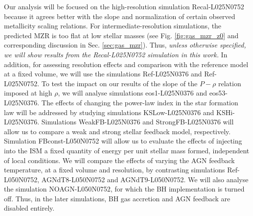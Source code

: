 \documentclass[useAMS,usenatbib]{mn2e}
\begin{document}
Our analysis will be focused on the high-resolution simulation Recal-L025N0752
because it agrees better with the 
slope and normalization of certain
observed metallicity scaling relations.
For intermediate-resolution simulations, the predicted MZR is too flat at
low stellar masses (see Fig. \ref{fig:gas_mzr_z0} and corresponding discussion 
in Sec. \ref{sec:gas_mzr}). 
Thus, {\em unless otherwise specified, 
we will show results from the Recal-L025N0752 simulation in this work.}
In addition, for assessing resolution effects and comparison with the
reference model at a fixed volume, we will use the
simulations Ref-L025N0376 and Ref-L025N0752.  To test the impact on our results of
the slope of the $P - \rho$ relation imposed at high $\rho$, 
we will analyse simulations eos1-L025N0376 and eos5\/3-L025N0376.
The effects of changing the power-law index in the star formation law
will be addressed by studying simulations KSLow-L025N0376 and KSHi-L025N0376.
Simulations WeakFB-L025N0376 and StrongFB-L025N0376 
will allow us to compare a weak and strong stellar feedback model, respectively.
Simulation FBconst-L050N0752 will allow us to evaluate the effects 
of injecting into the ISM a fixed quantity of energy
per unit stellar mass formed, independent of local conditions.
We will compare the effects of varying the AGN feedback temperature, 
at a fixed volume and resolution, by contrasting simulations Ref-L050N0752, 
AGNdT8-L050N0752 and AGNdT9-L050N0752. We will also analyse the simulation
NOAGN-L050N0752, for which the BH implementation is turned off.  Thus,
in the later simulations,
BH gas accretion and AGN feedback are disabled entirely.
\end{document}
